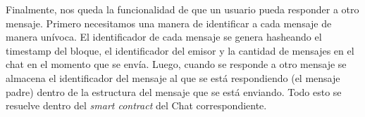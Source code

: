 Finalmente, nos queda la funcionalidad de que un usuario pueda responder a otro mensaje. Primero necesitamos una manera de identificar a cada mensaje de manera unívoca. El identificador de cada mensaje se genera hasheando el timestamp del bloque, el identificador del emisor y la cantidad de mensajes en el chat en el momento que se envía. Luego, cuando se responde a otro mensaje se almacena el identificador del mensaje al que se está respondiendo (el mensaje padre) dentro de la estructura del mensaje que se está enviando. Todo esto se resuelve dentro del \textit{smart contract} del Chat correspondiente.
